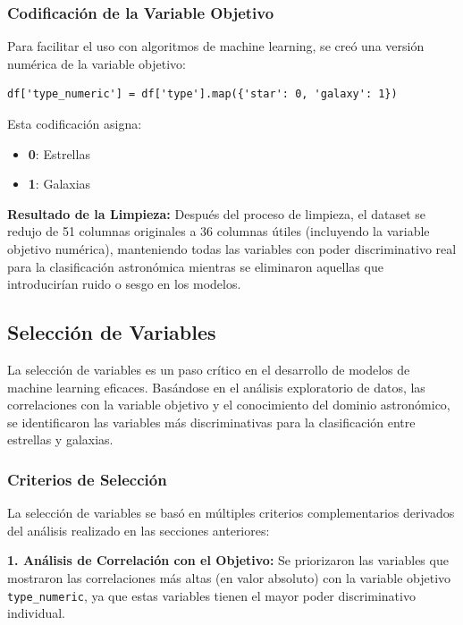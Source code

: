 \documentclass{article}
\begin{document}
\subsubsection{Codificación de la Variable Objetivo}

Para facilitar el uso con algoritmos de machine learning, se creó una versión numérica de la variable objetivo:

\begin{verbatim}
df['type_numeric'] = df['type'].map({'star': 0, 'galaxy': 1})
\end{verbatim}

Esta codificación asigna:
\begin{itemize}
    \item \textbf{0}: Estrellas
    \item \textbf{1}: Galaxias
\end{itemize}

\textbf{Resultado de la Limpieza:}
Después del proceso de limpieza, el dataset se redujo de 51 columnas originales a 36 columnas útiles (incluyendo la variable objetivo numérica), manteniendo todas las variables con poder discriminativo real para la clasificación astronómica mientras se eliminaron aquellas que introducirían ruido o sesgo en los modelos.

\subsection{Selección de Variables}

La selección de variables es un paso crítico en el desarrollo de modelos de machine learning eficaces. Basándose en el análisis exploratorio de datos, las correlaciones con la variable objetivo y el conocimiento del dominio astronómico, se identificaron las variables más discriminativas para la clasificación entre estrellas y galaxias.

\subsubsection{Criterios de Selección}

La selección de variables se basó en múltiples criterios complementarios derivados del análisis realizado en las secciones anteriores:

\textbf{1. Análisis de Correlación con el Objetivo:}
Se priorizaron las variables que mostraron las correlaciones más altas (en valor absoluto) con la variable objetivo \texttt{type\_numeric}, ya que estas variables tienen el mayor poder discriminativo individual.
\end{document}
